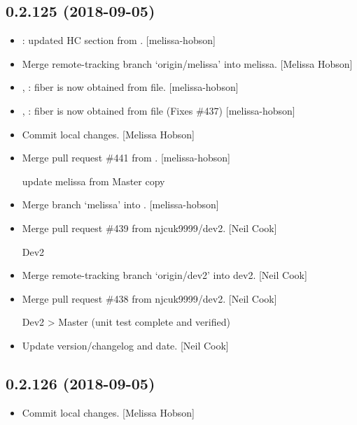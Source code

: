 \documentclass[a4paper,10pt,english]{report}
\begin{document}
\subsection{0.2.125 (2018-09-05)}
\label{\detokenize{misc/changelog:id337}}\begin{itemize}
\item {} 
: updated HC section from
. {[}melissa-hobson{]}

\item {} 
Merge remote-tracking branch ‘origin/melissa’ into melissa. {[}Melissa
Hobson{]}

\item {} 
, : fiber is now obtained from file.
{[}melissa-hobson{]}

\item {} 
, : fiber is now obtained from file
(Fixes \#437) {[}melissa-hobson{]}

\item {} 
Commit local changes. {[}Melissa Hobson{]}

\item {} 
Merge pull request \#441 from . {[}melissa-hobson{]}

update melissa from Master copy

\item {} 
Merge branch ‘melissa’ into . {[}melissa-hobson{]}

\item {} 
Merge pull request \#439 from njcuk9999/dev2. {[}Neil Cook{]}

Dev2

\item {} 
Merge remote-tracking branch ‘origin/dev2’ into dev2. {[}Neil Cook{]}

\item {} 
Merge pull request \#438 from njcuk9999/dev2. {[}Neil Cook{]}

Dev2 \textendash{}\textgreater{} Master (unit test complete and verified)

\item {} 
Update version/changelog and date. {[}Neil Cook{]}

\end{itemize}


\subsection{0.2.126 (2018-09-05)}
\label{\detokenize{misc/changelog:id338}}\begin{itemize}
\item {} 
Commit local changes. {[}Melissa Hobson{]}

\end{itemize}
\end{document}
